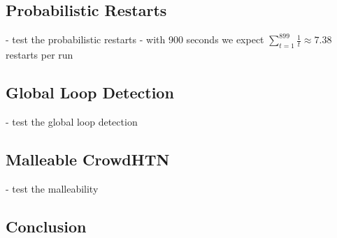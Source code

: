 \subsection{Probabilistic Restarts}
- test the probabilistic restarts
- with 900 seconds we expect $\sum_{t=1}^{899} \frac{1}{t} \approx 7.38$ restarts per run


\subsection{Global Loop Detection}
- test the global loop detection

\subsection{Malleable CrowdHTN}
- test the malleability

\subsection{Conclusion}
